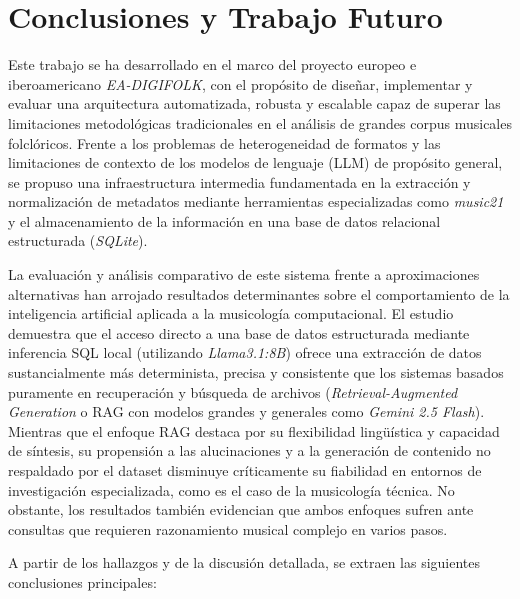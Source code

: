 \chapter{Conclusiones y Trabajo Futuro}
\label{cap:conclusiones}

Este trabajo se ha desarrollado en el marco del proyecto europeo e iberoamericano \textit{EA-DIGIFOLK}, con el propósito de diseñar, implementar y evaluar una arquitectura automatizada, robusta y escalable capaz de superar las limitaciones metodológicas tradicionales en el análisis de grandes corpus musicales folclóricos. Frente a los problemas de heterogeneidad de formatos y las limitaciones de contexto de los modelos de lenguaje (LLM) de propósito general, se propuso una infraestructura intermedia fundamentada en la extracción y normalización de metadatos mediante herramientas especializadas como \textit{music21} y el almacenamiento de la información en una base de datos relacional estructurada (\textit{SQLite}). 

La evaluación y análisis comparativo de este sistema frente a aproximaciones alternativas han arrojado resultados determinantes sobre el comportamiento de la inteligencia artificial aplicada a la musicología computacional. El estudio demuestra que el acceso directo a una base de datos estructurada mediante inferencia SQL local (utilizando \textit{Llama3.1:8B}) ofrece una extracción de datos sustancialmente más determinista, precisa y consistente que los sistemas basados puramente en recuperación y búsqueda de archivos (\textit{Retrieval-Augmented Generation} o RAG con modelos grandes y generales como \textit{Gemini 2.5 Flash}). Mientras que el enfoque RAG destaca por su flexibilidad lingüística y capacidad de síntesis, su propensión a las alucinaciones y a la generación de contenido no respaldado por el dataset disminuye críticamente su fiabilidad en entornos de investigación especializada, como es el caso de la musicología técnica. No obstante, los resultados también evidencian que ambos enfoques sufren ante consultas que requieren razonamiento musical complejo en varios pasos.

A partir de los hallazgos y de la discusión detallada, se extraen las siguientes conclusiones principales:

